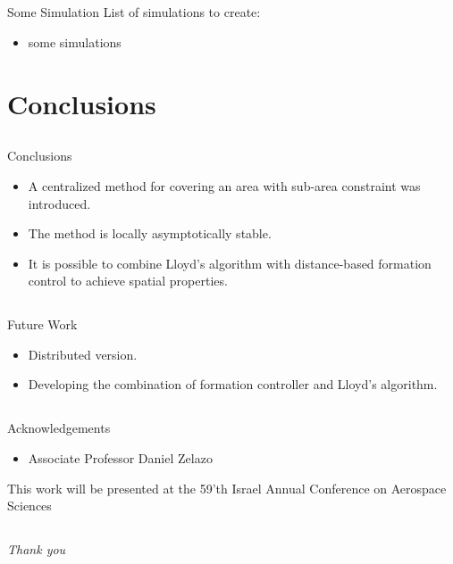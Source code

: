 \documentclass[t]{beamer}
\begin{document}
\subsection[Simulations]{}
\begin{frame}[label=sl3]{Some Simulation}
List of simulations to create:
\begin{itemize}
\item some simulations
\end{itemize}
\end{frame}


\section[Conclusions]{Conclusions}
\subsection[Conclusions]{}
\begin{frame}[label=conclusions]{Conclusions}
\begin{itemize}
\item A centralized method for covering an area with sub-area constraint was introduced.
\item The method is locally asymptotically stable.
\item It is possible to combine Lloyd's algorithm with distance-based formation control to achieve spatial properties.
\end{itemize}
\end{frame}
\subsection[Future Work]{}
\begin{frame}[label=futurework]{Future Work}
\begin{itemize}
\item Distributed version.
\item Developing the combination of formation controller and Lloyd's algorithm.
\end{itemize}
\end{frame}
\subsection[Acknowledgements]{}
\begin{frame}[label=acknowledgements]{Acknowledgements}
\begin{itemize}
\item Associate Professor Daniel Zelazo
\end{itemize} \pause
This work will be presented at the 59'th Israel Annual Conference on Aerospace Sciences
\end{frame}
\subsection[Thank you]{}
\begin{frame}{}
  \centering \Large
  \emph{Thank you}
\end{frame}
\end{document}
